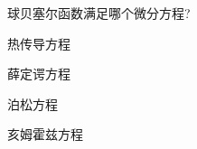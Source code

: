 \documentclass{njustexam}
\begin{document}



\begin{problem}
  球贝塞尔函数满足哪个微分方程? 

  \begin{abcd}
    \item 热传导方程
    \item 薛定谔方程
    \item 泊松方程
    \item 亥姆霍兹方程

  \end{abcd}
\end{problem}



  
\end{document}
